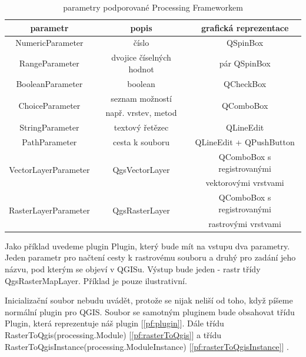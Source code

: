 \begin{table}	
	\centering
	\begin{tabular}{|c|c|c|}
		\hline
		\textbf{parametr} & \textbf{popis} & \textbf{grafická reprezentace}\\
		\hline
		\hline
		NumericParameter & číslo & QSpinBox\\
		\hline
		RangeParameter & dvojice číselných hodnot & pár QSpinBox\\	
		\hline
		BooleanParameter & boolean & QCheckBox\\		
		\hline
		\multirow{2}{*}{ChoiceParameter} & seznam možností & \multirow{2}{*}{QComboBox}\\
		& např. vrstev, metod & \\
		\hline
		StringParameter & textový řetězec & QLineEdit \\
		\hline
		PathParameter & cesta k souboru & QLineEdit + QPushButton \\
		\hline
		\multirow{2}{*}{VectorLayerParameter} & \multirow{2}{*}{QgsVectorLayer} & QComboBox s registrovanými \\
		& & vektorovými vrstvami\\
		\hline
		\multirow{2}{*}{RasterLayerParameter} & \multirow{2}{*}{QgsRasterLayer} & QComboBox s registrovanými \\
		& & rastrovými vrstvami\\		
		\hline	
	\end{tabular}
	\caption{parametry podporované Processing Frameworkem}
	\label{tab:pf_parametry}
\end{table}

Jako příklad uvedeme plugin Plugin, který bude mít na vstupu dva parametry. Jeden parametr pro načtení cesty k rastrovému souboru a druhý pro zadání jeho názvu, pod kterým se objeví v QGISu. Výstup bude jeden - rastr třídy QgsRasterMapLayer. Příklad je pouze ilustrativní.

Inicializační soubor nebudu uvádět, protože se nijak neliší od toho, když píšeme normální plugin pro QGIS. Soubor se samotným pluginem bude obsahovat třídu Plugin, která reprezentuje náš plugin [\autoref{pf:plugin}]. Dále třídu RasterToQgis(processing.Module) [\autoref{pf:rasterToQgis}] a třídu RasterToQgisInstance(processing.ModuleInstance) [\autoref{pf:rasterToQgisInstance}] .\\

